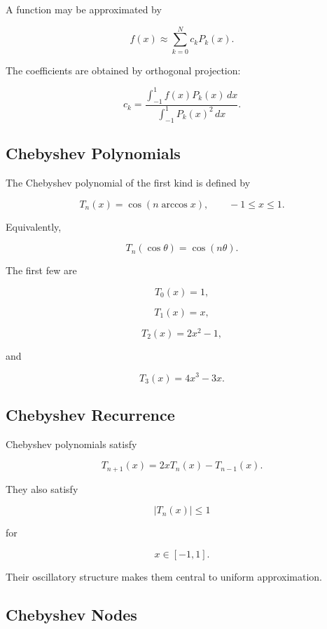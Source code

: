 A function may be approximated by

\[
\boxed{
f(x)
\approx
\sum_{k=0}^{N}
c_kP_k(x).
}
\]

The coefficients are obtained by orthogonal projection:

\[
\boxed{
c_k
=
\frac{
\int_{-1}^{1}
f(x)P_k(x)\,dx
}{
\int_{-1}^{1}
P_k(x)^2\,dx
}.
}
\]

\subsection{Chebyshev Polynomials}
\label{subsec:chebyshev-polynomials}

The Chebyshev polynomial of the first kind is defined by

\[
\boxed{
T_n(x)
=
\cos(n\arccos x),
\qquad
-1\leq x\leq1.
}
\]

Equivalently,

\[
\boxed{
T_n(\cos\theta)
=
\cos(n\theta).
}
\]

The first few are

\[
\boxed{
T_0(x)=1,
}
\]

\[
\boxed{
T_1(x)=x,
}
\]

\[
\boxed{
T_2(x)=2x^2-1,
}
\]

and

\[
\boxed{
T_3(x)=4x^3-3x.
}
\]

\subsection{Chebyshev Recurrence}
\label{subsec:chebyshev-recurrence}

Chebyshev polynomials satisfy

\[
\boxed{
T_{n+1}(x)
=
2xT_n(x)-T_{n-1}(x).
}
\]

They also satisfy

\[
\boxed{
|T_n(x)|\leq1
}
\]

for

\[
x\in[-1,1].
\]

Their oscillatory structure makes them central to uniform approximation.

\subsection{Chebyshev Nodes}
\label{subsec:chebyshev-nodes}


